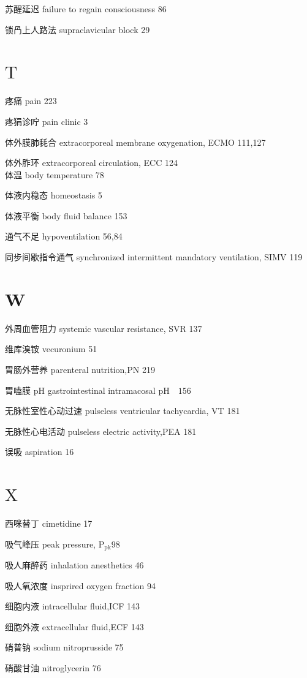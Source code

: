 \documentclass[10pt]{article}
\begin{document}
苏醒延迟 failure to regain consciousness 86

锁冎上人路法 supraclavicular block 29

\section*{$\mathrm{T}$}
疼痛 pain 223

疼狷诊咛 pain clinic 3

体外膜肺㲎合 extracorporeal membrane oxygenation, ECMO 111,127

体外胙环 extracorporeal circulation, ECC 124\\
体温 body temperature 78

体液内稳态 homeostasis 5

体液平衡 body fluid balance 153

通气不足 hypoventilation 56,84

同步间歇指令通气 synchronized intermittent mandatory ventilation, SIMV 119

\section*{W}
外周血管阻力 systemic vascular resistance, SVR 137

维库溴铵 vecuronium 51

胃肠外营养 parenteral nutrition,PN 219

胃嗑膜 $\mathrm{pH}$ gastrointestinal intramacosal $\mathrm{pH} \quad 156$

无脉性室性心动过速 pulseless ventricular tachycardia, VT 181

无脉性心电活动 pulseless electric activity,PEA 181

误吸 aspiration 16

\section*{$\mathrm{X}$}
西咪替丁 cimetidine 17

吸气峰压 peak pressure, $\mathrm{P}_{\mathrm{pk}} 98$

吸人麻醉药 inhalation anesthetics 46

吸人氧浓度 insprired oxygen fraction 94

细胞内液 intracellular fluid,ICF 143

细胞外液 extracellular fluid,ECF 143

硝普钠 sodium nitroprusside 75

硝酸甘油 nitroglycerin 76
\end{document}
